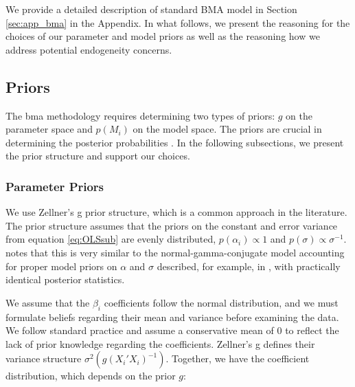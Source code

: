 \documentclass[a4paper,11pt]{article}
\begin{document}
We provide a detailed description of standard BMA model in Section \ref{sec:app_bma} in the Appendix. In what follows, we present the reasoning for the choices of our parameter and model priors as well as the reasoning how we address potential endogeneity concerns. 

\subsection*{Priors}
\label{sec:priors}
The \ac{bma} methodology requires determining two types of priors: $g$ on the parameter space and $p(M_{i})$ on the model space. The priors are crucial in determining the posterior probabilities \citep{FeldkircherZeugner2009,CicconeJarocinski2010,Liangetal2008}. In the following subsections, we present the prior structure and support our choices.

\subsubsection*{Parameter Priors}
We use Zellner's g prior structure, which is a common approach in the literature. The prior structure assumes that the priors on the constant and error variance from equation \ref{eq:OLSsub} are evenly distributed, $p(\alpha_{i}) \propto 1$ and $p(\sigma) \propto \sigma^{-1}$. \citet{Zeugner2011} notes that this is very similar to the normal-gamma-conjugate model accounting for proper model priors on $\alpha$ and $\sigma$ described, for example, in \citet{Koop2003}, with practically identical posterior statistics. 

We assume that the $\beta_{i}$ coefficients follow the normal distribution, and we must formulate beliefs regarding their mean and variance before examining the data. We follow standard practice and assume a conservative mean of 0 to reflect the lack of prior knowledge regarding the coefficients. Zellner's g defines their variance structure $\sigma^{2}(g(X_{i}'X_{i})^{-1})$. Together, we have the coefficient distribution, which depends on the prior $g$:
\end{document}
